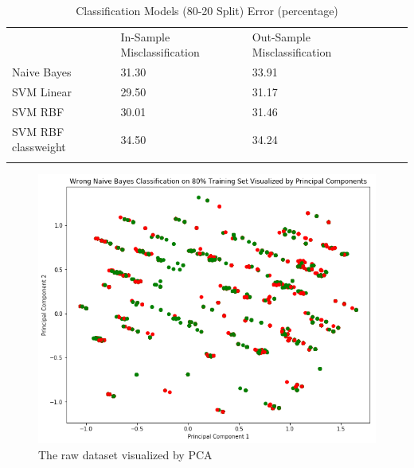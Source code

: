 \documentclass[10pt,twocolumn]{article}
\begin{document}
\begin{center}
\begin{table}[]
\centering
\caption{Classification Models (80-20 Split) Error (percentage)}
\label{my-label}
\begin{tabular}{lllll}
                & In-Sample Misclassification & Out-Sample Misclassification & \\
Naive Bayes        & 31.30              & 33.91                  & \\
SVM Linear    & 29.50              & 31.17               & \\
SVM RBF      & 30.01               & 31.46                & \\
SVM RBF classweight       & 34.50               & 34.24                  & \\
                &                           &                         &
\end{tabular}
\end{table}
\end{center}

\begin{figure}[!t]
  \begin{center}
    \includegraphics[width=6in]{pca.png}
  \end{center}

  \caption{\small The raw dataset visualized by PCA}
  \label{fig-1}
\end{figure}
\end{document}

